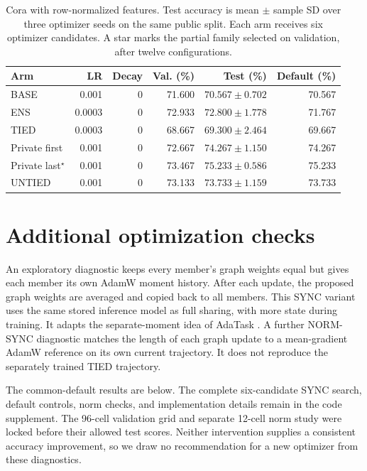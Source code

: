 \begin{table}[t]
\centering\small
\caption{Cora with row-normalized features. Test accuracy is mean $\pm$ sample SD over three optimizer seeds on the same public split. Each arm receives six optimizer candidates. A star marks the partial family selected on validation, after twelve configurations.}
\label{tab:cora-normalized}
\setlength{\tabcolsep}{4pt}
\begin{tabular}{lrrrrr}
\toprule
Arm & LR & Decay & Val. (\%) & Test (\%) & Default (\%)\\
\midrule
BASE & 0.001 & 0 & 71.600 & $70.567 \pm 0.702$ & 70.567\\
ENS & 0.0003 & 0 & 72.933 & $72.800 \pm 1.778$ & 71.767\\
TIED & 0.0003 & 0 & 68.667 & $69.300 \pm 2.464$ & 69.667\\
Private first & 0.001 & 0 & 72.667 & $74.267 \pm 1.150$ & 74.267\\
Private last$^{\star}$ & 0.001 & 0 & 73.467 & $75.233 \pm 0.586$ & 75.233\\
UNTIED & 0.001 & 0 & 73.133 & $73.733 \pm 1.159$ & 73.733\\
\bottomrule
\end{tabular}
\end{table}

\section{Additional optimization checks}\label{app:optimizer-history}
An exploratory diagnostic keeps every member's graph weights equal
but gives each member its own AdamW moment history. After each update,
the proposed graph weights are averaged and copied back to all members.
This SYNC variant uses the same stored inference model as full sharing,
with more state during training. It adapts the separate-moment idea of
AdaTask \citep{yang2023adatask}. A further NORM-SYNC diagnostic matches
the length of each graph update to a mean-gradient AdamW reference
on its own current trajectory. It does not reproduce the separately
trained TIED trajectory.

The common-default results are below. The complete six-candidate SYNC
search, default controls, norm checks, and implementation details remain
in the code supplement. The 96-cell validation grid and separate
12-cell norm study were locked before their allowed test scores.
Neither intervention supplies a consistent accuracy improvement, so
we draw no recommendation for a new optimizer from these diagnostics.

